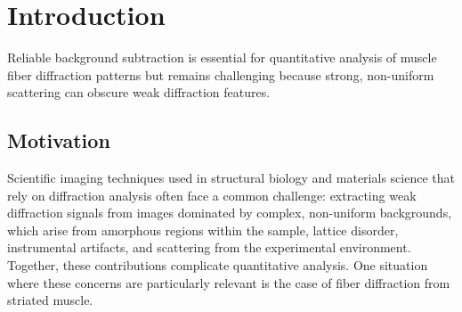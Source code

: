 \documentclass[11pt,onecolumn]{IEEEtran}
\begin{document}
\begin{abstract}

Accurate background subtraction is a critical preprocessing step for quantitative analysis of X-ray fiber diffraction patterns from striated muscle but is often performed heuristically, with limited guidance for parameter selection, leading to variability in downstream quantitative analyses. We present a unified framework that systematically evaluates and optimizes background subtraction methods using physically motivated image-quality metrics and synthetic signal validation to perform automated parameter search. Applied to synchrotron X-ray muscle fiber diffraction datasets, the framework improves subtraction consistency relative to ad hoc settings while preserving key diffraction features such as equatorial reflections and layer lines, and the resulting aggregate loss correlates with expert visual assessment and highlights characteristic failure modes of different subtraction strategies. Although developed for striated muscle diffraction, the approach is based on general signal and background properties and can be extended to other classes of fiber diffraction data. By formalizing evaluation and optimization, it supports more reliable quantitative analysis of synchrotron diffraction experiments.

\end{abstract}




\section{Introduction}

Reliable background subtraction is essential for quantitative analysis of muscle fiber diffraction patterns but remains challenging because strong, non-uniform scattering can obscure weak diffraction features.

\subsection{Motivation}

Scientific imaging techniques used in structural biology and materials science that rely on diffraction analysis often face a common challenge: extracting weak diffraction signals from images dominated by complex, non-uniform backgrounds, which arise from amorphous regions within the sample, lattice disorder, instrumental artifacts, and scattering from the experimental environment. Together, these contributions complicate quantitative analysis. One situation where these concerns are particularly relevant is the case of fiber diffraction from striated muscle.
\end{document}
